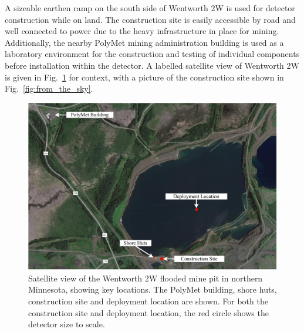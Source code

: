 A sizeable earthen ramp on the south side of Wentworth 2W is used for detector construction while
on land. The construction site is easily accessible by road and well connected to power due to the
heavy infrastructure in place for mining. Additionally, the nearby PolyMet mining administration
building is used as a laboratory environment for the construction and testing of individual
components before installation within the detector. A labelled satellite view of Wentworth 2W is
given in Fig.~\ref{fig:pit} for context, with a picture of the construction site shown in
Fig.~\ref{fig:from_the_sky}.

\begin{figure} %
    \includegraphics[width=\textwidth]{diagrams/4-chips/pit.pdf}
    \caption[Satellite view of the Wentworth 2W mine pit in northern Minnesota]
    {Satellite view of the Wentworth 2W flooded mine pit in northern Minnesota, showing key
        \chipsfive locations. The PolyMet building, shore huts, construction site and deployment
        location are shown. For both the construction site and deployment location, the red circle
        shows the \chipsfive detector size to scale.}
    \label{fig:pit}
\end{figure}


